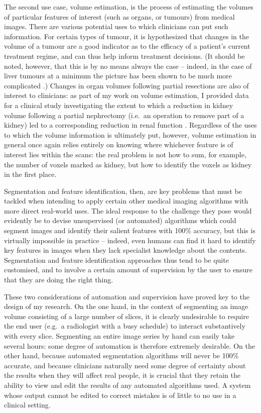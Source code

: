 The second use case, volume estimation, is the process of estimating the volumes of particular features of interest (such as organs, or tumours) from medical images. There are various potential uses to which clinicians can put such information. For certain types of tumour, it is hypothesized \cite{?} that changes in the volume of a tumour are a good indicator as to the efficacy of a patient's current treatment regime, and can thus help inform treatment decisions. (It should be noted, however, that this is by no means always the case -- indeed, in the case of liver tumours at a minimum the picture has been shown to be much more complicated \cite{?}.) Changes in organ volumes following partial resections are also of interest to clinicians: as part of my work on volume estimation, I provided data for a clinical study investigating the extent to which a reduction in kidney volume following a partial nephrectomy (i.e.~an operation to remove part of a kidney) led to a corresponding reduction in renal function \cite{pbgmvc09}. Regardless of the uses to which the volume information is ultimately put, however, volume estimation in general once again relies entirely on knowing where whichever feature is of interest lies within the scans: the real problem is not how to sum, for example, the number of voxels marked as kidney, but how to identify the voxels as kidney in the first place.

Segmentation and feature identification, then, are key problems that must be tackled when intending to apply certain other medical imaging algorithms with more direct real-world uses. The ideal response to the challenge they pose would evidently be to devise unsupervised (or automated) algorithms which could segment images and identify their salient features with 100\% accuracy, but this is virtually impossible in practice -- indeed, even humans can find it hard to identify key features in images when they lack specialist knowledge about the contents. Segmentation and feature identification approaches thus tend to be quite customised, and to involve a certain amount of supervision by the user to ensure that they are doing the right thing.

These two considerations of automation and supervision have proved key to the design of my research. On the one hand, in the context of segmenting an image volume consisting of a large number of slices, it is clearly undesirable to require the end user (e.g.~a radiologist with a busy schedule) to interact substantively with every slice. Segmenting an entire image series by hand can easily take several hours: some degree of automation is therefore extremely desirable. On the other hand, because automated segmentation algorithms will never be 100\% accurate, and because clinicians naturally need some degree of certainty about the results when they will affect real people, it is crucial that they retain the ability to view and edit the results of any automated algorithms used. A system whose output cannot be edited to correct mistakes is of little to no use in a clinical setting.

